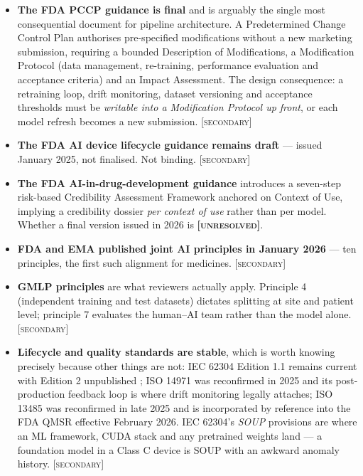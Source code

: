 \documentclass[11pt,a4paper]{article}
\newcommand{\flag}[1]{\textcolor{flagcolor}{\textbf{#1}}}
\newcommand{\secondary}{\textsc{[secondary]}}
\newcommand{\unresolved}{\flag{\textsc{[unresolved]}}}
\begin{document}
\begin{itemize}
  \item \textbf{The FDA PCCP guidance is final} \citep{fdapccp2024} and is
  arguably the single most consequential document for pipeline
  architecture. A Predetermined Change Control Plan authorises pre-specified
  modifications without a new marketing submission, requiring a bounded
  Description of Modifications, a Modification Protocol (data management,
  re-training, performance evaluation and acceptance criteria) and an Impact
  Assessment. The design consequence: a retraining loop, drift monitoring,
  dataset versioning and acceptance thresholds must be \emph{writable into a
  Modification Protocol up front}, or each model refresh becomes a new
  submission. \secondary

  \item \textbf{The FDA AI device lifecycle guidance remains draft}
  \citep{fdalifecycle2025} --- issued January 2025, not finalised. Not
  binding. \secondary

  \item \textbf{The FDA AI-in-drug-development guidance}
  \citep{fdaaidrug2025} introduces a seven-step risk-based Credibility
  Assessment Framework anchored on Context of Use, implying a credibility
  dossier \emph{per context of use} rather than per model. Whether a final
  version issued in 2026 is \unresolved.

  \item \textbf{FDA and EMA published joint AI principles in January 2026}
  \citep{fdaema2026} --- ten principles, the first such alignment for
  medicines. \secondary

  \item \textbf{GMLP principles} \citep{gmlp2021} are what reviewers
  actually apply. Principle 4 (independent training and test datasets)
  dictates splitting at site and patient level; principle 7 evaluates the
  human--AI team rather than the model alone. \secondary

  \item \textbf{Lifecycle and quality standards are stable}, which is worth
  knowing precisely because other things are not: IEC 62304 Edition 1.1
  remains current with Edition 2 unpublished \citep{iec62304}; ISO 14971
  \citep{iso14971} was reconfirmed in 2025 and its post-production feedback
  loop is where drift monitoring legally attaches; ISO 13485
  \citep{iso13485} was reconfirmed in late 2025 and is incorporated by
  reference into the FDA QMSR effective February 2026. IEC 62304's
  \emph{SOUP} provisions are where an ML framework, CUDA stack and any
  pretrained weights land --- a foundation model in a Class C device is SOUP
  with an awkward anomaly history. \secondary


\end{itemize}
\end{document}
